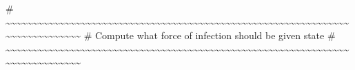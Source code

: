 \documentclass[
  11pt,
  letterpaper,
  DIV=11,
  numbers=noendperiod]{scrartcl}
\newenvironment{Shaded}{\begin{snugshade}}{\end{snugshade}}
\newcommand{\CommentTok}[1]{\textcolor[rgb]{0.37,0.37,0.37}{#1}}
\begin{document}
\begin{Shaded}
\begin{Highlighting}[]
\CommentTok{\# \textasciitilde{}\textasciitilde{}\textasciitilde{}\textasciitilde{}\textasciitilde{}\textasciitilde{}\textasciitilde{}\textasciitilde{}\textasciitilde{}\textasciitilde{}\textasciitilde{}\textasciitilde{}\textasciitilde{}\textasciitilde{}\textasciitilde{}\textasciitilde{}\textasciitilde{}\textasciitilde{}\textasciitilde{}\textasciitilde{}\textasciitilde{}\textasciitilde{}\textasciitilde{}\textasciitilde{}\textasciitilde{}\textasciitilde{}\textasciitilde{}\textasciitilde{}\textasciitilde{}\textasciitilde{}\textasciitilde{}\textasciitilde{}\textasciitilde{}\textasciitilde{}\textasciitilde{}\textasciitilde{}\textasciitilde{}\textasciitilde{}\textasciitilde{}\textasciitilde{}\textasciitilde{}\textasciitilde{}\textasciitilde{}\textasciitilde{}\textasciitilde{}\textasciitilde{}\textasciitilde{}\textasciitilde{}\textasciitilde{}\textasciitilde{}\textasciitilde{}\textasciitilde{}\textasciitilde{}\textasciitilde{}\textasciitilde{}\textasciitilde{}\textasciitilde{}\textasciitilde{}\textasciitilde{}\textasciitilde{}\textasciitilde{}\textasciitilde{}\textasciitilde{}\textasciitilde{}\textasciitilde{}\textasciitilde{}\textasciitilde{}\textasciitilde{}\textasciitilde{}\textasciitilde{}\textasciitilde{}\textasciitilde{}\textasciitilde{}\textasciitilde{}\textasciitilde{}\textasciitilde{}\textasciitilde{}\textasciitilde{}}
\CommentTok{\# Compute what force of infection should be given state}
\CommentTok{\# \textasciitilde{}\textasciitilde{}\textasciitilde{}\textasciitilde{}\textasciitilde{}\textasciitilde{}\textasciitilde{}\textasciitilde{}\textasciitilde{}\textasciitilde{}\textasciitilde{}\textasciitilde{}\textasciitilde{}\textasciitilde{}\textasciitilde{}\textasciitilde{}\textasciitilde{}\textasciitilde{}\textasciitilde{}\textasciitilde{}\textasciitilde{}\textasciitilde{}\textasciitilde{}\textasciitilde{}\textasciitilde{}\textasciitilde{}\textasciitilde{}\textasciitilde{}\textasciitilde{}\textasciitilde{}\textasciitilde{}\textasciitilde{}\textasciitilde{}\textasciitilde{}\textasciitilde{}\textasciitilde{}\textasciitilde{}\textasciitilde{}\textasciitilde{}\textasciitilde{}\textasciitilde{}\textasciitilde{}\textasciitilde{}\textasciitilde{}\textasciitilde{}\textasciitilde{}\textasciitilde{}\textasciitilde{}\textasciitilde{}\textasciitilde{}\textasciitilde{}\textasciitilde{}\textasciitilde{}\textasciitilde{}\textasciitilde{}\textasciitilde{}\textasciitilde{}\textasciitilde{}\textasciitilde{}\textasciitilde{}\textasciitilde{}\textasciitilde{}\textasciitilde{}\textasciitilde{}\textasciitilde{}\textasciitilde{}\textasciitilde{}\textasciitilde{}\textasciitilde{}\textasciitilde{}\textasciitilde{}\textasciitilde{}\textasciitilde{}\textasciitilde{}\textasciitilde{}\textasciitilde{}\textasciitilde{}\textasciitilde{}}

\end{Highlighting}
\end{Shaded}
\end{document}
